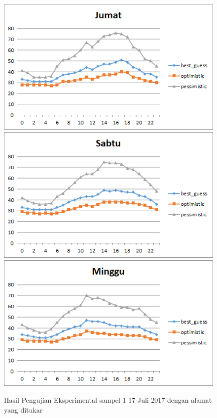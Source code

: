 \begin{figure}[H]
				\centering		
				\includegraphics[]{Gambar/jumatsampel117072017reverse.png}
				\includegraphics[]{Gambar/sabtusampel117072017reverse.png}
				\includegraphics[]{Gambar/minggusampel117072017reverse.png}
				\caption[Hasil Pengujian Eksperimental]{Hasil Pengujian Eksperimental sampel 1 17 Juli 2017 dengan alamat yang ditukar}
				\label{fig:eksperimentalsampel117072017reverse}
\end{figure}	
\newpage
			
